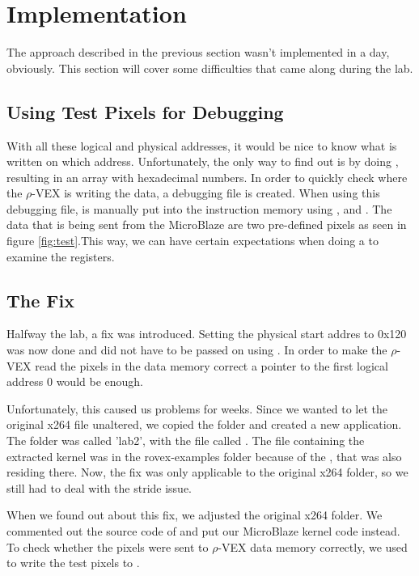 
\section{Implementation}

The approach described in the previous section wasn't implemented in a day, obviously. This section will cover some difficulties that came along during the lab.


\subsection{Using Test Pixels for Debugging}
With all these logical and physical addresses, it would be nice to know what is written on which address. Unfortunately, the only way to find out is by doing , resulting in an array with hexadecimal numbers. In order to quickly check where the $\rho$-VEX is writing the data, a debugging file  is created. When using this debugging file,  is manually put into the instruction memory using ,  and . The data that is being sent from the MicroBlaze are two pre-defined pixels as seen in figure \ref{fig:test}.This way, we can have certain expectations when doing a  to examine the registers. 


\subsection{The Fix}
Halfway the lab, a fix was introduced. Setting the physical start addres to 0x120 was now done and did not have to be passed on using . In order to make the $\rho$-VEX read the pixels in the data memory correct a pointer to the first logical address 0 would be enough.

Unfortunately, this caused us problems for weeks. Since we wanted to let the original x264 file unaltered, we copied the folder and created a new application. The folder was called 'lab2', with the  file called . The  file containing the extracted kernel was in the rovex-examples folder because of the , that was also residing there. Now, the fix was only applicable to the original x264 folder, so we still had to deal with the stride issue.

When we found out about this fix, we adjusted the original x264 folder. We commented out the source code of  and put our MicroBlaze kernel code instead. To check whether the pixels were sent to $\rho$-VEX data memory correctly, we used  to write the test pixels to . 

